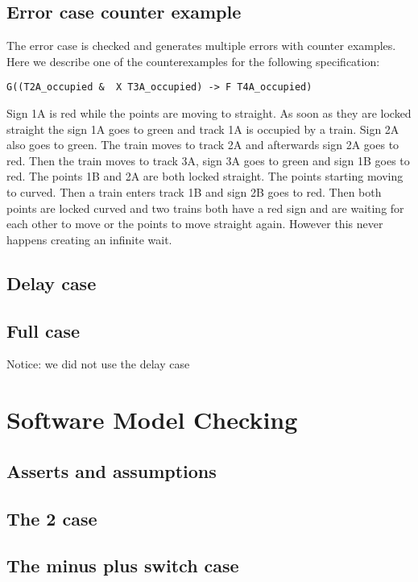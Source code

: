 \documentclass[a4paper]{article}
\begin{document}
	
	\subsection{Error case counter example}
	The error case is checked and generates multiple errors with counter examples. Here we describe one of the counterexamples for the following specification: 
	\begin{lstlisting}
G((T2A_occupied &  X T3A_occupied) -> F T4A_occupied)
	\end{lstlisting}
	Sign 1A is red while the points are moving to straight. As soon as they are locked straight the sign 1A goes to green and track 1A is occupied by a train. Sign 2A also goes to green. The train moves to track 2A and afterwards sign 2A goes to red. Then the train moves to track 3A, sign 3A goes to green and sign 1B goes to red. The points 1B and 2A are both locked straight. The points starting moving to curved. Then a train enters track 1B and sign 2B goes to red. Then both points are locked curved and two trains both have a red sign and are waiting for each other to move or the points to move straight again. However this never happens creating an infinite wait.	

	\subsection{Delay case}
	
	
	\subsection{Full case}
	Notice: we did not use the delay case
	
	
	\section{Software Model Checking}
	
	
	\subsection{Asserts and assumptions}
	
	
	\subsection{The 2 case}
	
	
	\subsection{The minus plus switch case}
	
	
	
\end{document}
